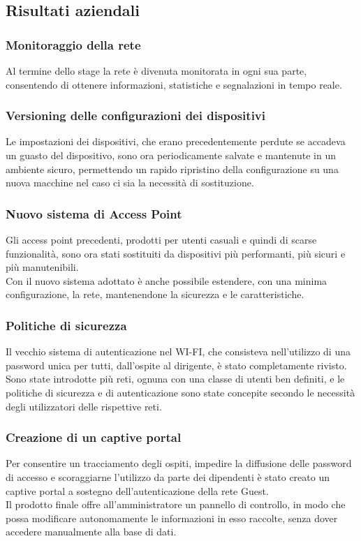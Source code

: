 \documentclass[Tesi.tex]{subfiles}
\begin{document}
\subsection{Risultati aziendali}
\subsubsection{Monitoraggio della rete}
Al termine dello stage la rete è divenuta monitorata in ogni sua parte, consentendo di ottenere informazioni, statistiche e segnalazioni in tempo reale.

\subsubsection{Versioning delle configurazioni dei dispositivi}
Le impostazioni dei dispositivi, che erano precedentemente perdute se accadeva un guasto del dispositivo, sono ora periodicamente salvate e mantenute in un ambiente sicuro, permettendo un rapido ripristino della configurazione su una nuova macchine nel caso ci sia la necessità di sostituzione.

\subsubsection{Nuovo sistema di Access Point}
Gli access point precedenti, prodotti per utenti casuali e quindi di scarse funzionalità, sono ora stati sostituiti da dispositivi più performanti, più sicuri e più manutenibili. \\
Con il nuovo sistema adottato è anche possibile estendere, con una minima configurazione, la rete, mantenendone la sicurezza e le caratteristiche.

\subsubsection{Politiche di sicurezza}
Il vecchio sistema di autenticazione nel WI-FI, che consisteva nell'utilizzo di una password unica per tutti, dall'ospite al dirigente, è stato completamente rivisto. \\
Sono state introdotte più reti, ognuna con una classe di utenti ben definiti, e le politiche di sicurezza e di autenticazione sono state concepite secondo le necessità degli utilizzatori delle rispettive reti.

\subsubsection{Creazione di un captive portal}
Per consentire un tracciamento degli ospiti, impedire la diffusione delle password di accesso e scoraggiarne l'utilizzo da parte dei dipendenti è stato creato un captive portal a sostegno dell'autenticazione della rete Guest. \\ 
Il prodotto finale offre all'amministratore un pannello di controllo, in modo che possa modificare autonomamente le informazioni in esso raccolte, senza dover accedere manualmente alla base di dati.
\end{document}
